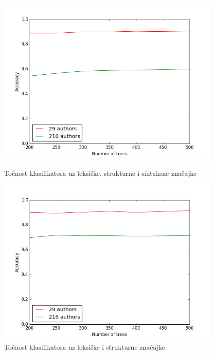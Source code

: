 \newpage
\begin{figure}[htb]
  \centering
  \begin{minipage}[b]{0.4\textwidth}
    \includegraphics[width=\textwidth]{fig/sve_znacajke_bez_fs.png}
    \caption{Točnost klasifikatora uz leksičke, strukturne i sintaksne značajke}
    \label{sve_znacajke}
  \end{minipage}
  \hfill
  \begin{minipage}[b]{0.4\textwidth} 
    \includegraphics[width=\textwidth]{fig/leksicke_bez_fs.png}
    \caption{Točnost klasifikatora uz leksičke i strukturne značajke}
    \label{leks_znacajke}
  \end{minipage}
\end{figure}

